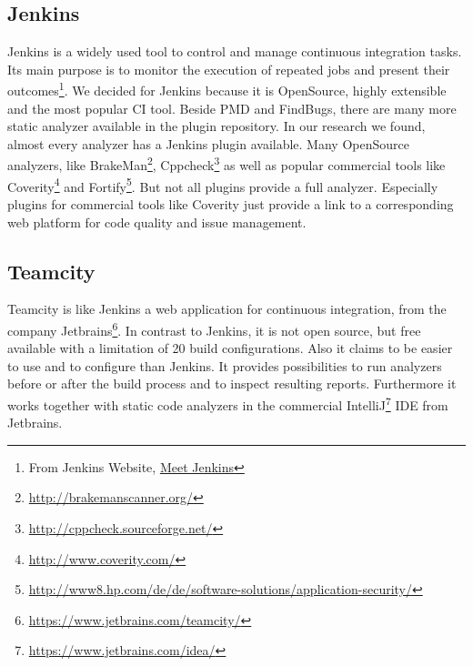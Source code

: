 \documentclass[conference]{IEEEtran}
\begin{document}
\subsection{Jenkins}
\label{subsec:jenkins}
Jenkins is a widely used tool to control and manage continuous integration tasks. Its main purpose is to monitor the execution of repeated jobs and present their outcomes\footnote{From Jenkins Website, \href{https://wiki.jenkins-ci.org/display/JENKINS/Meet+Jenkins}{Meet Jenkins}}.
We decided for Jenkins because it is OpenSource, highly extensible and the most popular CI tool.
Beside PMD and FindBugs, there are many more static analyzer available in the plugin repository.
In our research we found, almost every analyzer has a Jenkins plugin available.
Many OpenSource analyzers, like BrakeMan\footnote{\href{http://brakemanscanner.org/}{http://brakemanscanner.org/}}, Cppcheck\footnote{\href{http://cppcheck.sourceforge.net/}{http://cppcheck.sourceforge.net/}} as well as popular commercial tools like Coverity\footnote{\href{http://www.coverity.com/}{http://www.coverity.com/}} and Fortify\footnote{\href{http://www8.hp.com/de/de/software-solutions/application-security/}{http://www8.hp.com/de/de/software-solutions/application-security/}}.
But not all plugins provide a full analyzer.
Especially plugins for commercial tools like Coverity just provide a link to a corresponding web platform for code quality and issue management. 




\subsection{Teamcity}
\label{subsec:static_code_analysis_teamcity}
Teamcity is like Jenkins a web application for continuous integration, from the company Jetbrains\footnote{\href{https://www.jetbrains.com/teamcity/}{https://www.jetbrains.com/teamcity/}}. In contrast to Jenkins, it is not open source, but free available with a limitation of 20 build configurations.
Also it claims to be easier to use and to configure than Jenkins.
It provides possibilities to run analyzers before or after the build process and to inspect resulting reports.
Furthermore it works together with static code analyzers in the commercial IntelliJ\footnote{\href{https://www.jetbrains.com/idea/}{https://www.jetbrains.com/idea/}} IDE from Jetbrains.
\end{document}
